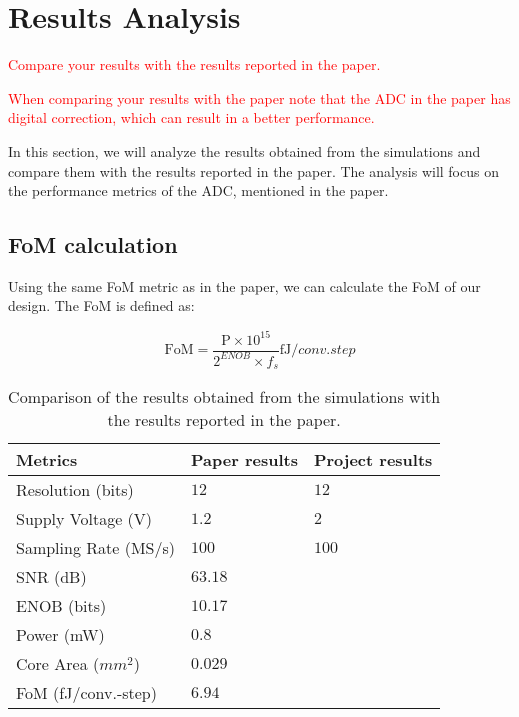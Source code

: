 \section{Results Analysis}
\label{sec:results}
\textcolor{red}{Compare your results with the results reported in the paper.}

\textcolor{red}{When comparing your results with the paper note that the ADC in the paper has digital correction, which can result in a better performance.}

In this section, we will analyze the results obtained from the simulations and compare them with the results reported in the paper. The analysis will focus on the performance metrics of the ADC, mentioned in the paper.

\subsection{FoM calculation}

Using the same FoM metric as in the paper, we can calculate the FoM of our design. The FoM is defined as:

\begin{equation}
    \text{FoM} = \frac{\text{P} \times 10^{15}}{2^{ENOB} \times f_s } \si{\femto \joule \per conv.step}
    \label{eq:FoM}
\end{equation}

\begin{table}[h]
    \centering
    \caption{Comparison of the results obtained from the simulations with the results reported in the paper.}
    \begin{tabularx}{\textwidth}{>{\centering\arraybackslash}X >{\centering\arraybackslash}X >{\centering\arraybackslash}X }
        \toprule
        \textbf{Metrics} & \textbf{Paper results} & \textbf{Project results}\\
        \midrule
        Resolution (bits) & $12$ & $12$ \\
        \midrule
        Supply Voltage (V) & $1.2$ & $2$ \\
        \midrule
        Sampling Rate (MS/s) & $100$ & $100$  \\
        \midrule
        SNR (dB) & $63.18$ & $ $ \\
        \midrule
        ENOB (bits) & $10.17$ & $ $ \\
        \midrule
        Power (mW) & $0.8$ & $ $   \\
        \midrule
        Core Area ($mm^2$) & $0.029$ & $ $   \\
        \midrule
        FoM (fJ/conv.-step) & $6.94$ & $ $  \\
        \bottomrule
    \end{tabularx}
    \label{tab:comparison_results}
\end{table}

